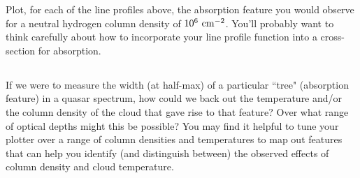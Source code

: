 \documentclass[11pt]{article}
\begin{document}
Plot, for each of the line profiles above, the absorption feature
you would observe for a neutral hydrogen column density of $10^6~{\rm cm}^{-2}$.  You'll probably
want to think carefully about how to incorporate your line profile function into a cross-section for
absorption.

\subsection{}
If we were to measure the width (at half-max) of a particular ``tree" (absorption feature) in a
quasar spectrum, how could we back out the temperature and/or the column density of the cloud that gave
rise to that feature?  Over what range of optical depths might this be possible?  You may find it helpful
to tune your plotter over a range of column densities and temperatures to map out features that can help
you identify (and distinguish between) the observed effects of column density and cloud temperature.
\end{document}
